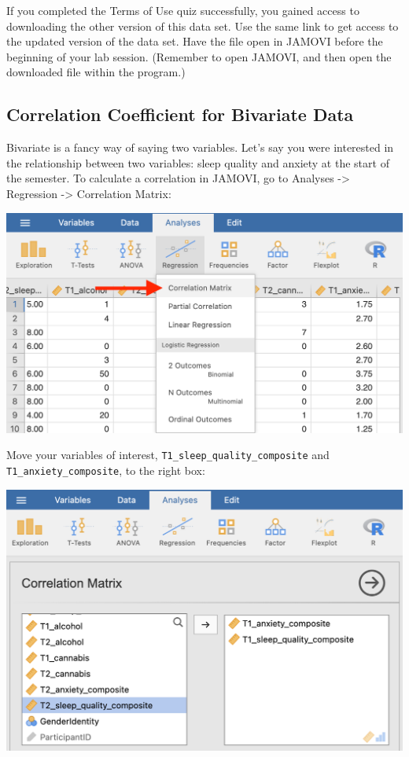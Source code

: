 \documentclass[
]{book}
\begin{document}
If you completed the Terms of Use quiz successfully, you gained access to downloading the other version of this data set. Use the same link to get access to the updated version of the data set. Have the file open in JAMOVI before the beginning of your lab session. (Remember to open JAMOVI, and then open the downloaded file within the program.)

\hypertarget{correlation-coefficient-for-bivariate-data}{%
\subsection{Correlation Coefficient for Bivariate Data}\label{correlation-coefficient-for-bivariate-data}}

Bivariate is a fancy way of saying two variables. Let's say you were interested in the relationship between two variables: sleep quality and anxiety at the start of the semester. To calculate a correlation in JAMOVI, go to
{Analyses} -\textgreater{} {Regression} -\textgreater{} {Correlation Matrix}:

\includegraphics{img/cormenu.png}

Move your variables of interest, \texttt{T1\_sleep\_quality\_composite} and \texttt{T1\_anxiety\_composite}, to the right box:

\includegraphics{img/corvars.png}
\end{document}

